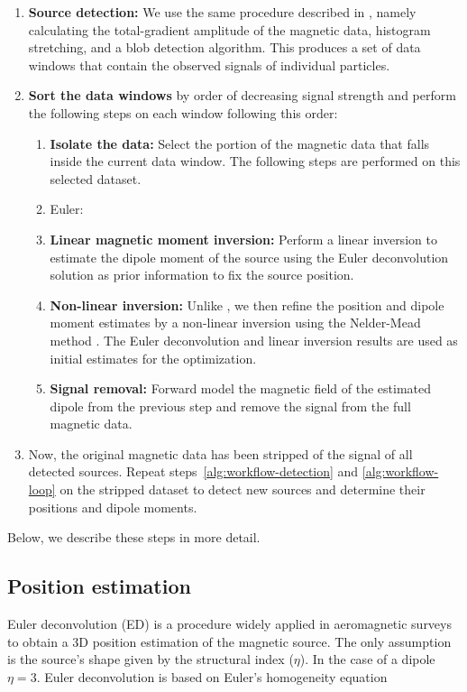 \begin{enumerate}
    \item \textbf{Source detection:} We use the same procedure described in \citet{Souza-Junior2024}, namely calculating the total-gradient amplitude of the magnetic data, histogram stretching, and a blob detection algorithm. This produces a set of data windows that contain the observed signals of individual particles. 
    \label{alg:workflow-detection}
    \item \textbf{Sort the data windows} by order of decreasing signal strength and perform the following steps on each window following this order:
    \label{alg:workflow-loop}
    \begin{enumerate}
        \item \textbf{Isolate the data:} Select the portion of the magnetic data that falls inside the current data window. The following steps are performed on this selected dataset.
        \item {Euler:}
        \item \textbf{Linear magnetic moment inversion:} Perform a linear inversion to estimate the dipole moment of the source using the Euler deconvolution solution as prior information to fix the source position.
        \item \textbf{Non-linear inversion:} Unlike \citet{Souza-Junior2024}, we then refine the position and dipole moment estimates by a non-linear inversion using the Nelder-Mead method \citep{Nelder-Mead1965,Gao2010}. The Euler deconvolution and linear inversion results are used as initial estimates for the optimization.
        \item \textbf{Signal removal:} Forward model the magnetic field of the estimated dipole from the previous step and remove the signal from the full magnetic data. 
    \end{enumerate}
    \item Now, the original magnetic data has been stripped of the signal of all detected sources. Repeat steps~\ref{alg:workflow-detection} and \ref{alg:workflow-loop} on the stripped dataset to detect new sources and determine their positions and dipole moments.
\end{enumerate}

\noindent
Below, we describe these steps in more detail.

\subsection{Position estimation}
    Euler deconvolution (ED) \citep{Reid1990} is a procedure widely applied in aeromagnetic surveys \citep{Barbosa2011, Melo2013} to obtain a 3D position estimation of the magnetic source. The only assumption is the source's shape given by the structural index ($\eta$).
    In the case of a dipole $\eta = 3$. Euler deconvolution is based on Euler's homogeneity equation
    
